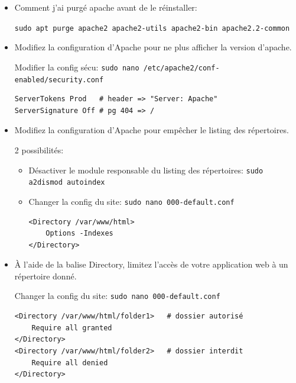 \documentclass[a4paper]{article}
\begin{document}
\begin{itemize}


\item Comment j'ai purgé apache avant de le réinstaller:
\begin{example}
    \texttt{sudo apt purge apache2 apache2-utils apache2-bin apache2.2-common}
\end{example}


\item Modifiez la configuration d’Apache pour ne plus afficher la version d'apache.
\begin{example}

Modifier la config sécu: \texttt{sudo nano /etc/apache2/conf-enabled/security.conf}
\begin{example} \begin{verbatim}
ServerTokens Prod   # header => "Server: Apache"
ServerSignature Off # pg 404 => /
\end{verbatim} \end{example}

\end{example}


\item Modifiez la configuration d’Apache pour empêcher le listing des répertoires.
\begin{example}
2 possibilités:
\begin{itemize}

\item Désactiver le module responsable du listing des répertoires: \texttt{sudo a2dismod autoindex}

\item Changer la config du site: \texttt{sudo nano 000-default.conf}
\begin{example} \begin{verbatim}
<Directory /var/www/html>
    Options -Indexes
</Directory>
\end{verbatim} \end{example}

\end{itemize}
\end{example}


\item À l’aide de la balise Directory, limitez l’accès de votre application web à un répertoire donné.
\begin{example}

Changer la config du site: \texttt{sudo nano 000-default.conf}
\begin{example} \begin{verbatim}
<Directory /var/www/html/folder1>   # dossier autorisé
    Require all granted
</Directory>
<Directory /var/www/html/folder2>   # dossier interdit
    Require all denied
</Directory>
\end{verbatim} \end{example}
    

\end{example}
\end{itemize}
\end{document}
